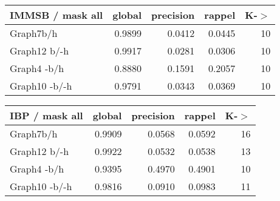 \begin{table*} 
    \caption{K = 10}
	\begin{minipage}[h]{0.45\linewidth} 
\begin{tabular}{lrrrr}
\hline
 IMMSB / mask all   &   global &   precision &   rappel &     K-\ensuremath{>} \\
\hline
 Graph7b/h          &   0.9899 &      0.0412 &   0.0445 & 10 \\
 Graph12 b/-h       &   0.9917 &      0.0281 &   0.0306 & 10 \\
 Graph4 -b/h        &   0.8880 &      0.1591 &   0.2057 & 10 \\
 Graph10 -b/-h      &   0.9791 &      0.0343 &   0.0369 & 10 \\
\hline
\end{tabular}
\end{minipage}
\hspace{0.5cm}
\begin{minipage}[h]{0.45\linewidth}
\begin{tabular}{lrrrr}
\hline
 IBP / mask all   &   global &   precision &   rappel &     K-\ensuremath{>} \\
\hline
 Graph7b/h        &   0.9909 &      0.0568 &   0.0592 & 16 \\
 Graph12 b/-h     &   0.9922 &      0.0532 &   0.0538 & 13 \\
 Graph4 -b/h      &   0.9395 &      0.4970 &   0.4901 & 10 \\
 Graph10 -b/-h    &   0.9816 &      0.0910 &   0.0983 & 11 \\
\hline
\end{tabular}
\end{minipage}
\end{table*}


